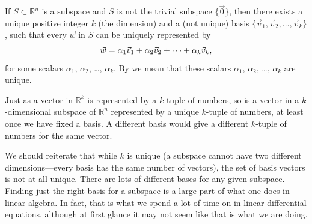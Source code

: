 \begin{theorem}
\pagebreak[2]
If $S \subset {\mathbb R}^n$ is a subspace and $S$ is not the trivial
subspace $\{ \vec{0} \}$, then there exists a
unique positive integer $k$ (the dimension) and a (not unique)
basis
$\{ \vec{v}_1, \vec{v}_2, \ldots, \vec{v}_k \}$, such that every
$\vec{w}$ in $S$ can be uniquely represented by
\begin{equation*}
\vec{w} =
\alpha_1 \vec{v}_1 +
\alpha_2 \vec{v}_2 +
\cdots
+
\alpha_k \vec{v}_k ,
\avoidbreak
\end{equation*}
for some scalars $\alpha_1$, $\alpha_2$, \ldots, $\alpha_k$.
By  we mean that these
scalars $\alpha_1$, $\alpha_2$, \ldots, $\alpha_k$ are unique.
\end{theorem}

Just as a vector in ${\mathbb R}^k$ is represented by a $k$-tuple of
numbers, so is a vector in a $k$-dimensional subspace of ${\mathbb R}^n$
represented by a unique $k$-tuple of numbers, at least once we have fixed a basis.
A different basis would give a different $k$-tuple of numbers for the same
vector.

We should reiterate that while $k$ is unique
(a subspace cannot have two different dimensions---every
basis has the same number of vectors),
the set of basis vectors is not at all unique.  There are lots
of different bases for any given subspace.  Finding just the right basis for
a subspace is a large part of what one does in linear algebra.  In fact,
that is what we spend a lot of time on in
linear differential equations, although at first glance
it may not seem like that is what we are doing.

